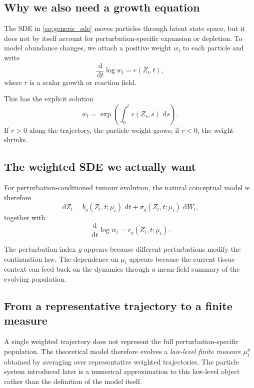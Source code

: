 \documentclass[11pt]{article}
\newcommand{\dd}{\,\mathrm{d}}
\begin{document}
\subsection{Why we also need a growth equation}

The SDE in \cref{eq:generic_sde} moves particles through latent state space, but it does not by itself account for perturbation-specific expansion or depletion. To model abundance changes, we attach a positive weight $w_t$ to each particle and write
\begin{equation}
\frac{\dd}{\dd t}\log w_t = r(Z_t,t),
\label{eq:generic_growth}
\end{equation}
where $r$ is a scalar growth or reaction field.

This has the explicit solution
\begin{equation}
w_t
=
\exp\!\left(
\int_0^t r(Z_s,s)\,\dd s
\right).
\label{eq:generic_growth_solution}
\end{equation}
If $r>0$ along the trajectory, the particle weight grows; if $r<0$, the weight shrinks.

\subsection{The weighted SDE we actually want}

For perturbation-conditioned tumour evolution, the natural conceptual model is therefore
\begin{equation}
\dd Z_t = b_g(Z_t,t;\mu_t)\,\dd t + \sigma_g(Z_t,t;\mu_t)\,\dd W_t,
\label{eq:conceptual_sde}
\end{equation}
together with
\begin{equation}
\frac{\dd}{\dd t}\log w_t = r_g(Z_t,t;\mu_t).
\label{eq:conceptual_weight}
\end{equation}

The perturbation index $g$ appears because different perturbations modify the continuation law. The dependence on $\mu_t$ appears because the current tissue context can feed back on the dynamics through a mean-field summary of the evolving population.

\subsection{From a representative trajectory to a finite measure}

A single weighted trajectory does not represent the full perturbation-specific population. The theoretical model therefore evolves a \emph{law-level finite measure} $\mu_t^g$ obtained by averaging over representative weighted trajectories. The particle system introduced later is a numerical approximation to this law-level object rather than the definition of the model itself.
\end{document}

